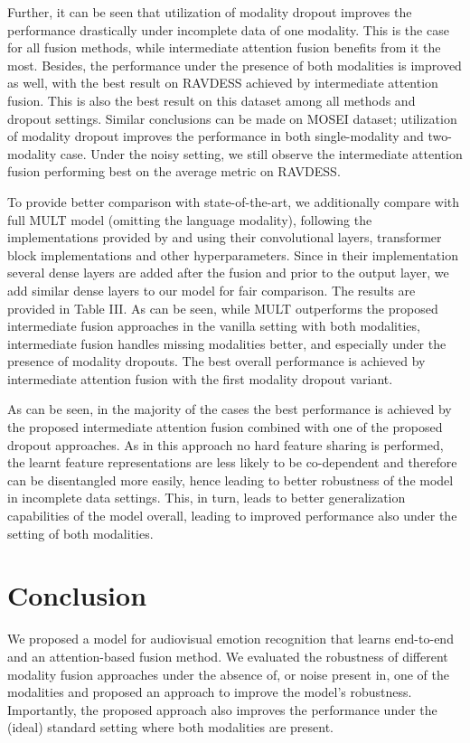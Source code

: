 \documentclass[a4paper,conference]{IEEEtran}
\begin{document}
Further, it can be seen that utilization of modality dropout improves the performance drastically under incomplete data of one modality. This is the case for all fusion methods, while intermediate attention fusion benefits from it the most.  Besides, the performance under the presence of both modalities is improved as well, with the best result on RAVDESS achieved by intermediate attention fusion. This is also the best result on this dataset among all methods and dropout settings. Similar conclusions can be made on MOSEI dataset; utilization of modality dropout improves the performance in both single-modality and two-modality case. 
Under the noisy setting, we still observe the intermediate attention fusion performing best on the average metric on RAVDESS. 

To provide better comparison with state-of-the-art, we additionally compare with full MULT model (omitting the language modality), following the implementations provided by \cite{mult} and using their convolutional layers, transformer block implementations and other hyperparameters. Since in their implementation several dense layers are added after the fusion and prior to the output layer, we add similar dense layers to our model for fair comparison. The results are provided in Table III. As can be seen, while MULT outperforms the proposed intermediate fusion approaches in the vanilla setting with both modalities, intermediate fusion handles missing modalities better, and especially under the presence of modality dropouts. The best overall performance is achieved by intermediate attention fusion with the first modality dropout variant.  

As can be seen, in the majority of the cases the best performance is achieved by the proposed intermediate attention fusion combined with one of the proposed dropout approaches. As in this approach no hard feature sharing is performed, the learnt feature representations are less likely to be co-dependent and therefore can be disentangled more easily, hence leading to better robustness of the model in incomplete data settings. This, in turn, leads to better generalization capabilities of the model overall, leading to improved performance also under the setting of both modalities.


\section{Conclusion}
We proposed a model for audiovisual emotion recognition that learns end-to-end and an attention-based fusion method. We evaluated the robustness of different modality fusion approaches under the absence of, or noise present in, one of the modalities and proposed an approach to improve the model's robustness. Importantly, the proposed approach also improves the performance under the (ideal) standard setting where both modalities are present.




















\end{document}
